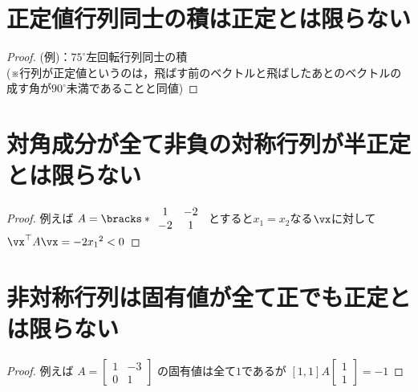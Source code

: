     \section{正定値行列同士の積は正定とは限らない}
        \begin{proof}
            (例)：$75^\circ$左回転行列同士の積\\
            (※行列が正定値というのは，飛ばす前のベクトルと飛ばしたあとのベクトルの成す角が$90^\circ$未満であることと同値)
        \end{proof}
    \section{対角成分が全て非負の対称行列が半正定とは限らない}
        \begin{proof}
            例えば
            $
                A =
                \bracks*{
                    \begin{array}{cc}
                        1 & -2\\
                        -2 & 1\\
                    \end{array}
                }
            $
            とすると$x_1=x_2$なる$\vx$に対して$\vx^\top A\vx = -2{x_1}^2 < 0$
        \end{proof}
    \section{非対称行列は固有値が全て正でも正定とは限らない}
        \begin{proof}
            例えば
            $
                A =
                \begin{bmatrix}
                    1 & -3 \\
                    0 & 1
                \end{bmatrix}
            $
            の固有値は全て$1$であるが
            $
                [1,1]A
                \begin{bmatrix}
                    1 \\
                    1
                \end{bmatrix}
                = -1
            $
        \end{proof}
